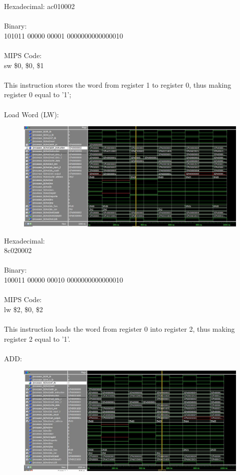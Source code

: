 \documentclass[paper=letter, fontsize=11pt]{scrartcl} %
\numberwithin{equation}{section}
\numberwithin{figure}{section}
\numberwithin{table}{section}
\begin{document}
Hexadecimal:
ac010002
\\
\\
Binary:
\\
101011 00000 00001 0000000000000010
\\
\\
MIPS Code:
\\
sw \$0, \$0, \$1
\\
\\
This instruction stores the word from register 1 to register 0, thus making register 0 equal to '1';
\\
\pagebreak
\\
Load Word (LW):

\begin{figure}[H]
	\centering
		\includegraphics[width=150mm]{../sim/photo/lw.JPG}
	\label{fig:lw}
\end{figure}

Hexadecimal:
\\
8c020002
\\
\\
Binary:
\\
100011 00000 00010 0000000000000010
\\
\\
MIPS Code:
\\
lw \$2, \$0,  \$2
\\
\\
This instruction loads the word from register 0 into register 2, thus making register 2 equal to '1'.
\\
\pagebreak
\\
ADD:

\begin{figure}[H]
	\centering
		\includegraphics[width=150mm]{../sim/photo/add.JPG}
	\label{fig:ADD}
\end{figure}
\end{document}
